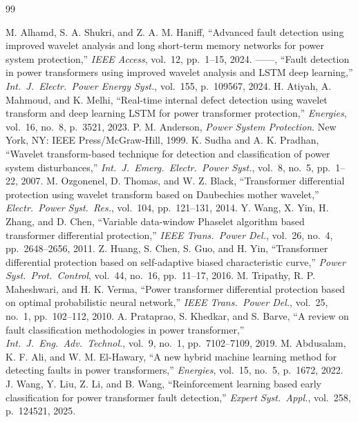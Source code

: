 \documentclass[12pt,a4paper,oneside]{report}
\begin{document}
\begin{thebibliography}{99}
 M. Alhamd, S. A. Shukri, and Z. A. M. Haniff, ``Advanced fault detection using improved wavelet analysis and long short-term memory networks for power system protection,'' \textit{IEEE Access}, vol.~12, pp.~1--15, 2024.
 ------, ``Fault detection in power transformers using improved wavelet analysis and LSTM deep learning,'' \textit{Int.\ J.\ Electr.\ Power Energy Syst.}, vol.~155, p.~109567, 2024.
 H. Atiyah, A. Mahmoud, and K. Melhi, ``Real-time internal defect detection using wavelet transform and deep learning LSTM for power transformer protection,'' \textit{Energies}, vol.~16, no.~8, p.~3521, 2023.
 P. M. Anderson, \textit{Power System Protection}. New York, NY: IEEE Press/McGraw-Hill, 1999.
 K. Sudha and A. K. Pradhan, ``Wavelet transform-based technique for detection and classification of power system disturbances,'' \textit{Int.\ J.\ Emerg.\ Electr.\ Power Syst.}, vol.~8, no.~5, pp.~1--22, 2007.
 M. Ozgonenel, D. Thomas, and W. Z. Black, ``Transformer differential protection using wavelet transform based on Daubechies mother wavelet,'' \textit{Electr.\ Power Syst.\ Res.}, vol.~104, pp.~121--131, 2014.
 Y. Wang, X. Yin, H. Zhang, and D. Chen, ``Variable data-window Phaselet algorithm based transformer differential protection,'' \textit{IEEE Trans.\ Power Del.}, vol.~26, no.~4, pp.~2648--2656, 2011.
 Z. Huang, S. Chen, S. Guo, and H. Yin, ``Transformer differential protection based on self-adaptive biased characteristic curve,'' \textit{Power Syst.\ Prot.\ Control}, vol.~44, no.~16, pp.~11--17, 2016.
 M. Tripathy, R. P. Maheshwari, and H. K. Verma, ``Power transformer differential protection based on optimal probabilistic neural network,'' \textit{IEEE Trans.\ Power Del.}, vol.~25, no.~1, pp.~102--112, 2010.
 A. Prataprao, S. Khedkar, and S. Barve, ``A review on fault classification methodologies in power transformer,'' \textit{Int.\ J.\ Eng.\ Adv.\ Technol.}, vol.~9, no.~1, pp.~7102--7109, 2019.
 M. Abdusalam, K. F. Ali, and W. M. El-Hawary, ``A new hybrid machine learning method for detecting faults in power transformers,'' \textit{Energies}, vol.~15, no.~5, p.~1672, 2022.
 J. Wang, Y. Liu, Z. Li, and B. Wang, ``Reinforcement learning based early classification for power transformer fault detection,'' \textit{Expert Syst.\ Appl.}, vol.~258, p.~124521, 2025.

\end{thebibliography}
\end{document}
